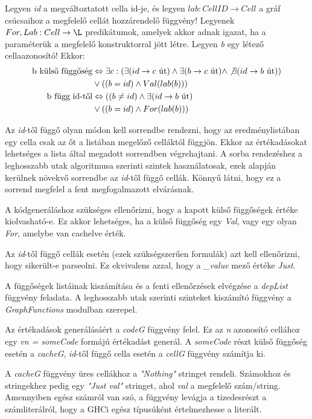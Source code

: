 Legyen \textit{id} a megváltoztatott cella id-je, és legyen $lab : CellID \rightarrow Cell$ a gráf csúcsaihoz a megfelelő cellát hozzárendelő függvény! Legyenek $For,Lab : Cell \rightarrow \L$ predikátumok, amelyek akkor adnak igazat, ha a paraméterük a megfelelő konstruktorral jött létre. Legyen \textit{b} egy létező cellaazonosító! Ekkor:
\begin{align*}
	\text{b külső függőség} &\Leftrightarrow \exists c: (\exists (id \rightarrow c \text{ út}) \wedge \exists (b \rightarrow c \text{ út}) \wedge \not\exists  (id \rightarrow b \text{ út})) \\
	& \vee((b=id) \wedge Val(lab(b))) \\
	\text{b függ id-től} &\Leftrightarrow ((b \not= id) \wedge \exists (id \rightarrow b \text{ út}) \\
	&\vee ((b = id) \wedge For(lab(b)))
\end{align*}

Az \textit{id}-től függő olyan módon kell sorrendbe rendezni, hogy az eredménylistában egy cella csak az őt a listában megelőző celláktól függjön. Ekkor az értékadásokat lehetséges a lista által megadott sorrendben végrehajtani. A sorba rendezéshez a leghosszabb utak algoritmusa szerinti szintek használatosak, ezek alapján kerülnek növekvő sorrendbe az \textit{id}-től függő cellák. Könnyű látni, hogy ez a sorrend megfelel a fent megfogalmazott elvárásnak.  

A kódgeneráláshoz szükséges ellenőrizni, hogy a kapott külső függőségek értéke kiolvasható-e. Ez akkor lehetséges, ha a külső függőség egy \textit{Val}, vagy egy olyan \textit{For}, amelybe van cachelve érték.

Az \textit{id}-től függő cellák esetén (ezek szükségszerűen formulák) azt kell ellenőrizni, hogy sikerült-e parseolni. Ez ekvivalens azzal, hogy a \textit{\_value} mező értéke \textit{Just}.

A függőségek listáinak kiszámítása és a fenti ellenőrzések elvégzése a \textit{depList} függvény feladata. A leghosszabb utak szerinti szinteket kiszámító függvény a \textit{GraphFunctions} modulban szerepel. 

Az értékadások generálásáért a \textit{codeG} függvény felel. Ez az \textit{n} azonosító cellához egy \textit{vn = someCode} formájú értékadást generál. A \textit{someCode} részt külső függőség esetén a \textit{cacheG}, \textit{id}-től függő cella esetén a \textit{cellG} függvény számítja ki.

A \textit{cacheG} függvény üres cellákhoz a \textit{"Nothing"} stringet rendeli. Számokhoz és stringekhez pedig egy \textit{"Just val"} stringet, ahol \textit{val} a megfelelő szám/string. Amennyiben egész számról van szó, a függvény levágja a tizedesrészt a számliterálról, hogy a GHCi egész típusúként értelmezhesse a literált.

